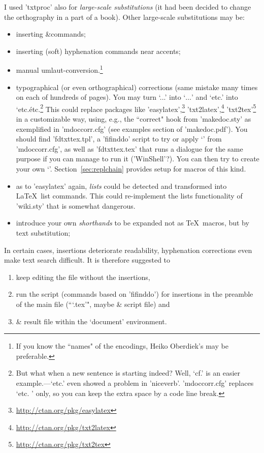 \documentclass{article}
\begin{document}
I used 'txtproc' also for \emph{large-scale substitutions} 
(it had been decided to change the orthography in a part of a book).
Other large-scale substitutions may be: 
\begin{itemize}
\item inserting &\index commands;
\item inserting (soft) hyphenation commands near accents; 
\item manual umlaut-conversion.\footnote{If you know the ``names" 
        of the encodings, Heiko Oberdiek's 
        may be preferable.}
\item typographical (or even orthographical) corrections (same mistake 
      many times on each of hundreds of pages). 
      You may turn `...' into `$\dots$' and `etc.' into `etc.\' 
      etc.\footnote{But what when a new sentence is starting indeed? 
        Well, `cf.' is an easier example.---`etc.' even showed 
        a problem in 'niceverb'. 'mdoccorr.cfg' replaces `etc. ' 
        only, so you can keep the extra space by a code line break.}
      This could replace packages like 
      'easylatex',\footnote{\url{http://ctan.org/pkg/easylatex}} 
      'txt2latex',\footnote{\url{http://ctan.org/pkg/txt2latex}} 
      'txt2tex'\footnote{\url{http://ctan.org/pkg/txt2tex}} 
      in a customizable way, using, e.g., the ``correct"
      hook from 'makedoc.sty' as exemplified in 'mdoccorr.cfg' 
      (see examples section of 'makedoc.pdf'). 
      You should find 'fdtxttex.tpl', a 'fifinddo' script 
      to try or apply `\MakeDocCorrectHook' from 'mdoccorr.cfg', 
      as well as 'fdtxttex.tex' that runs a dialogue for the 
      same purpose if you can manage to run it ('WinShell'?).
      You can then try to create your own `\MakeDocCorrectHook'. 
      Section~\ref{sec:replchain} provides setup for macros 
      of this kind. 
\item as to 'easylatex' again, \emph{lists} could be detected and 
      transformed into \LaTeX\ list commands. This could re-implement 
      the lists functionality of 'wiki.sty' that is somewhat 
      dangerous. %
\item introduce your own \emph{shorthands} to be expanded not as \TeX\ macros, 
      but by text substitution;
\end{itemize}
%
In certain cases, insertions deteriorate readability, hyphenation 
corrections even make text search difficult. 
It is therefore suggested to 
\begin{enumerate}
\item keep editing the file without the insertions, 
\item run the script (commands based on 'fifinddo') for insertions 
      in the preamble of the main file 
      (```\jobname.tex'", maybe & script file) and 
\item & result file within the `document' environment. 
\end{enumerate}
\end{document}
